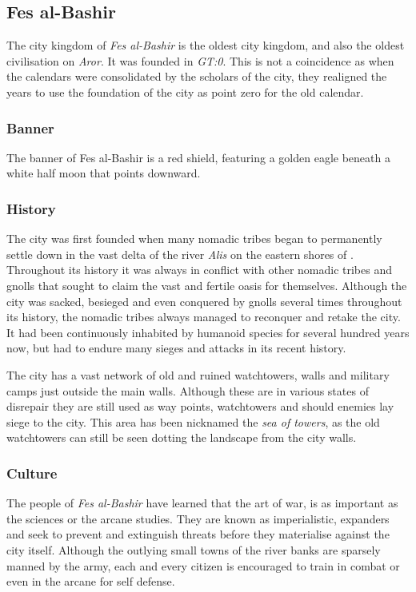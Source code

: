 \subsection{Fes al-Bashir}
\label{sec:Fes al-Bashir}

The city kingdom of \emph{Fes al-Bashir} is the oldest city kingdom, and also
the oldest civilisation on \emph{Aror}. It was founded in \emph{GT:0}. This is
not a coincidence as when the calendars were consolidated by the scholars of
the city, they realigned the years to use the foundation of the city as point
zero for the old calendar.

\subsubsection{Banner}

The banner of Fes al-Bashir is a red shield, featuring a golden eagle beneath
a white half moon that points downward.

\subsubsection{History}

The city was first founded when many nomadic tribes began to permanently
settle down in the vast delta of the river \emph{Alis} on the eastern shores
of . Throughout its history it was always in conflict with
other nomadic tribes and gnolls that sought to claim the vast and fertile
oasis for themselves. Although the city was sacked, besieged and even
conquered by gnolls several times throughout its history, the nomadic tribes
always managed to reconquer and retake the city. It had been continuously
inhabited by humanoid species for several hundred years now, but had to endure
many sieges and attacks in its recent history.

The city has a vast network of old and ruined watchtowers, walls and military
camps just outside the main walls. Although these are in various states of
disrepair they are still used as way points, watchtowers and should enemies
lay siege to the city. This area has been nicknamed the \emph{sea of towers},
as the old watchtowers can still be seen dotting the landscape from the city
walls.

\subsubsection{Culture}

The people of \emph{Fes al-Bashir} have learned that the art of war, is as
important as the sciences or the arcane studies. They are known as
imperialistic, expanders and seek to prevent and extinguish threats before
they materialise against the city itself. Although the outlying small towns of
the river banks are sparsely manned by the army, each and every citizen is
encouraged to train in combat or even in the arcane for self defense.

